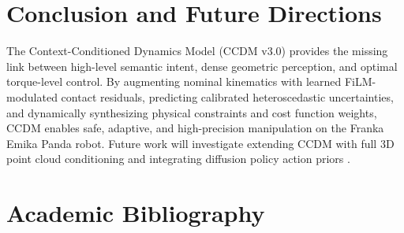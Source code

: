 \documentclass[10pt,a4paper]{article}
\begin{document}
\section{Conclusion and Future Directions}
The Context-Conditioned Dynamics Model (CCDM v3.0) provides the missing link between high-level semantic intent, dense geometric perception, and optimal torque-level control. By augmenting nominal kinematics with learned FiLM-modulated contact residuals, predicting calibrated heteroscedastic uncertainties, and dynamically synthesizing physical constraints and cost function weights, CCDM enables safe, adaptive, and high-precision manipulation on the Franka Emika Panda robot. Future work will investigate extending CCDM with full 3D point cloud conditioning and integrating diffusion policy action priors \cite{chi2023diffusion, ajay2021opal}.

\section{Academic Bibliography}


\end{document}
